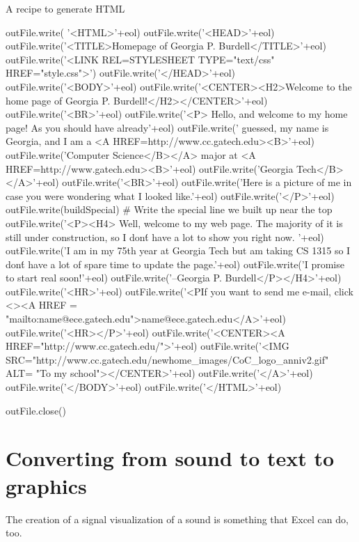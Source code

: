 \begin{recipe}{A recipe to generate HTML}
\begin{example}
    outFile.write( '<HTML>'+eol)
    outFile.write('<HEAD>'+eol)
    outFile.write('<TITLE>Homepage of Georgia P. Burdell</TITLE>'+eol)
    outFile.write('<LINK REL=STYLESHEET TYPE="text/css" HREF="style.css">')      
    outFile.write('</HEAD>'+eol)
    outFile.write('<BODY>'+eol)
    outFile.write('<CENTER><H2>Welcome to the home page of Georgia P. Burdell!</H2></CENTER>'+eol)
    outFile.write('<BR>'+eol)
    outFile.write('<P> Hello, and welcome to my home page! As you should have already'+eol)
    outFile.write(' guessed, my name is Georgia, and I am a <A HREF=http://www.cc.gatech.edu><B>'+eol) 
    outFile.write('Computer Science</B></A> major at <A HREF=http://www.gatech.edu><B>'+eol)
    outFile.write('Georgia Tech</B> </A>'+eol)
    outFile.write('<BR>'+eol)
    outFile.write('Here is a picture of me in case you were wondering what I looked like.'+eol)
    outFile.write('</P>'+eol)
    outFile.write(buildSpecial)                                        # Write the special line we built up near the top
    outFile.write('<P><H4> Well, welcome to my web page. The majority of it is still under construction, so I don\'t have a lot to show you right now. '+eol)
    outFile.write('I am in my 75th year at Georgia Tech but am taking CS 1315 so I don\'t have a lot of spare time to update the page.'+eol)
    outFile.write('I promise to start real soon!'+eol)
    outFile.write('--Georgia P. Burdell</P></H4>'+eol)
    outFile.write('<HR>'+eol)
    outFile.write('<PIf you want to send me e-mail, click <><A HREF = "mailto:name@ece.gatech.edu">name@ece.gatech.edu</A>'+eol)
    outFile.write('<HR></P>'+eol)
    outFile.write('<CENTER><A HREF="http://www.cc.gatech.edu/">'+eol)
    outFile.write('<IMG SRC="http://www.cc.gatech.edu/newhome_images/CoC_logo_anniv2.gif" ALT= "To my school"></CENTER>'+eol)
    outFile.write('</A>'+eol)
    outFile.write('</BODY>'+eol)
    outFile.write('</HTML>'+eol)

    outFile.close()
\end{example}
\end{recipe}


\section{Converting from sound to text to graphics}

	The creation of a signal visualization of a sound is something that Excel can do, too.

